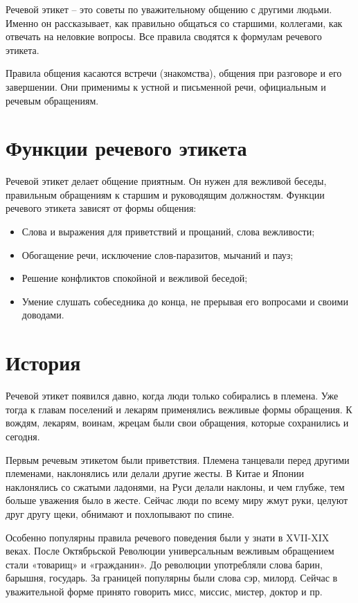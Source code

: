 \documentclass[a4paper, 12pt]{article}%
\begin{document}
Речевой этикет – это советы по уважительному общению с другими людьми. Именно он рассказывает, как правильно общаться со старшими, коллегами, как отвечать на неловкие вопросы. Все правила сводятся к формулам речевого этикета.

Правила общения касаются встречи (знакомства), общения при разговоре и его завершении. Они применимы к устной и письменной речи, официальным и речевым обращениям.

\section{Функции речевого этикета}
Речевой этикет делает общение приятным. Он нужен для вежливой беседы, правильным обращениям к старшим и руководящим должностям. Функции речевого этикета зависят от формы общения:

\begin{itemize}
\item Слова и выражения для приветствий и прощаний, слова вежливости;
\item Обогащение речи, исключение слов-паразитов, мычаний и пауз;
\item Решение конфликтов спокойной и вежливой беседой;
\item Умение слушать собеседника до конца, не прерывая его вопросами и своими доводами. 
\end{itemize} 

\section{История}
Речевой этикет появился давно, когда люди только собирались в племена. Уже тогда к главам поселений и лекарям применялись вежливые формы обращения. К вождям, лекарям, воинам, жрецам были свои обращения, которые сохранились и сегодня.

Первым речевым этикетом были приветствия. Племена танцевали перед другими племенами, наклонялись или делали другие жесты. В Китае и Японии наклонялись со сжатыми ладонями, на Руси делали наклоны, и чем глубже, тем больше уважения было в жесте. Сейчас люди по всему миру жмут руки, целуют друг другу щеки, обнимают и похлопывают по спине.

Особенно популярны правила речевого поведения были у знати в XVII-XIX веках. После Октябрьской Революции универсальным вежливым обращением стали «товарищ» и «гражданин». До революции употребляли слова барин, барышня, государь. За границей популярны были слова сэр, милорд. Сейчас в уважительной форме принято говорить мисс, миссис, мистер, доктор и пр.
\end{document}
